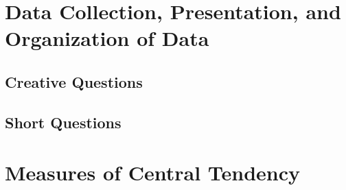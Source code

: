 \documentclass[a4paper,oneside]{book}
\begin{document}
\chapter{Data Collection, Presentation, and Organization of Data} 

\section{Creative Questions}

  
\section{Short Questions}

\chapter{Measures of Central Tendency} 
\end{document}
